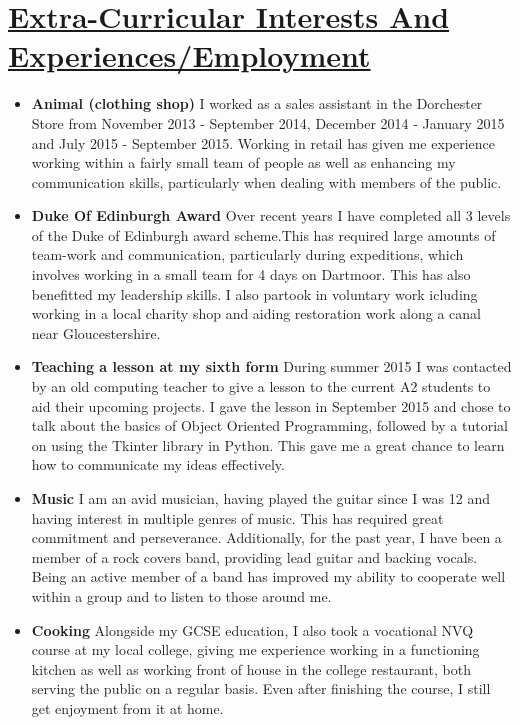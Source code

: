 \documentclass[11pt]{article}
\begin{document}
	\vspace{-20pt}
	\hspace{-100pt}\section*{\underline{Extra-Curricular Interests And Experiences/Employment}}
			\begin{itemize}
				\item \textbf{Animal (clothing shop) }I worked as a sales assistant in the Dorchester Store from November 2013 - September 2014, December 2014 - January 2015 and July 2015 - September 2015. Working in retail has given me experience working within a fairly small team of people as well as enhancing my communication skills, particularly when dealing with members of the public. 
				\item \textbf{Duke Of Edinburgh Award} Over recent years I have completed all 3 levels of the Duke of Edinburgh award scheme.This has required large amounts of team-work and communication, particularly during expeditions, which involves working in a small team for 4 days on Dartmoor. This has also benefitted my leadership skills. I also partook in voluntary work icluding working in a local charity shop and aiding restoration work along a canal near Gloucestershire.
				\item \textbf{Teaching a lesson at my sixth form} During summer 2015 I was contacted by an old computing teacher to give a lesson to the current A2 students to aid their upcoming projects. I gave the lesson in September 2015 and chose to talk about the basics of Object Oriented Programming, followed by a tutorial on using the Tkinter library in Python. This gave me a great chance to learn how to communicate my ideas effectively. 
				\item \textbf{Music} I am an avid musician, having played the guitar since I was 12 and having interest in multiple genres of music. This has required great commitment and perseverance. Additionally, for the past year, I have been a member of a rock covers band, providing lead guitar and backing vocals. Being an active member of a band has improved my ability to cooperate well within a group and to listen to those around me. 
				\item \textbf{Cooking} Alongside my GCSE education, I also took a vocational NVQ course at my local college, giving me experience working in a functioning kitchen as well as working front of house in the college restaurant, both serving the public on a regular basis. Even after finishing the course, I still get enjoyment from it at home.
			\end{itemize}
\end{document}
